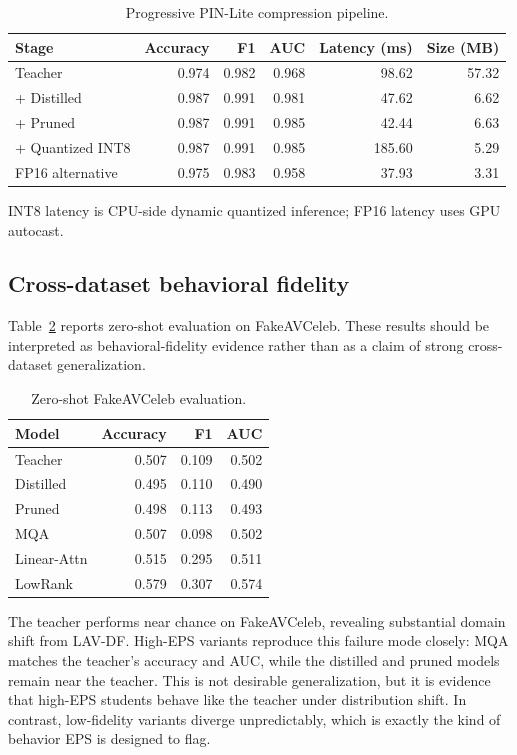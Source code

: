 \documentclass[pdflatex,sn-basic,Numbered]{sn-jnl}
\begin{document}
\begin{table}[t]
\caption{Progressive PIN-Lite compression pipeline.}\label{tab:progressive}
\centering
\scriptsize
\setlength{\tabcolsep}{5pt}
\begin{tabular}{lrrrrr}
\toprule
Stage & Accuracy & F1 & AUC & Latency (ms) & Size (MB) \\
\midrule
Teacher & 0.974 & 0.982 & 0.968 & 98.62 & 57.32 \\
+ Distilled & 0.987 & 0.991 & 0.981 & 47.62 & 6.62 \\
+ Pruned & 0.987 & 0.991 & 0.985 & 42.44 & 6.63 \\
+ Quantized INT8 & 0.987 & 0.991 & 0.985 & 185.60 & 5.29 \\
FP16 alternative & 0.975 & 0.983 & 0.958 & 37.93 & 3.31 \\
\bottomrule
\end{tabular}
\par\scriptsize\raggedright INT8 latency is CPU-side dynamic quantized inference; FP16 latency uses GPU autocast.
\end{table}

\subsection{Cross-dataset behavioral fidelity}\label{subsec:cross-dataset}

Table~\ref{tab:cross-dataset} reports zero-shot evaluation on FakeAVCeleb. These results should be interpreted as behavioral-fidelity evidence rather than as a claim of strong cross-dataset generalization.

\begin{table}[t]
\caption{Zero-shot FakeAVCeleb evaluation.}\label{tab:cross-dataset}
\centering
\begin{tabular}{lrrr}
\toprule
Model & Accuracy & F1 & AUC \\
\midrule
Teacher & 0.507 & 0.109 & 0.502 \\
Distilled & 0.495 & 0.110 & 0.490 \\
Pruned & 0.498 & 0.113 & 0.493 \\
MQA & 0.507 & 0.098 & 0.502 \\
Linear-Attn & 0.515 & 0.295 & 0.511 \\
LowRank & 0.579 & 0.307 & 0.574 \\
\bottomrule
\end{tabular}
\end{table}

The teacher performs near chance on FakeAVCeleb, revealing substantial domain shift from LAV-DF. High-EPS variants reproduce this failure mode closely: MQA matches the teacher's accuracy and AUC, while the distilled and pruned models remain near the teacher. This is not desirable generalization, but it is evidence that high-EPS students behave like the teacher under distribution shift. In contrast, low-fidelity variants diverge unpredictably, which is exactly the kind of behavior EPS is designed to flag.
\end{document}
